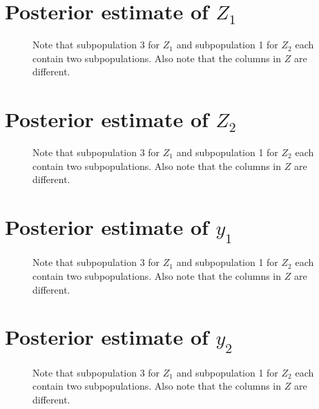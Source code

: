 \documentclass[10pt]{article} %
\begin{document}
\newpage
\section{Posterior estimate of $Z_1$}
\begin{figure}[H]
  \begin{center}  %
  \end{center}
  \caption{Note that subpopulation 3 for $Z_1$ and subpopulation 1 for $Z_2$
  each contain two subpopulations. Also note that the columns in $Z$ are different.}
  \label{fig:yzest}
\end{figure}

\newpage
\section{Posterior estimate of $Z_2$}
\begin{figure}[H]
  \begin{center}  %
  \end{center}
  \caption{Note that subpopulation 3 for $Z_1$ and subpopulation 1 for $Z_2$
  each contain two subpopulations. Also note that the columns in $Z$ are different.}
  \label{fig:yzest}
\end{figure}

\newpage
\section{Posterior estimate of $y_1$}
\begin{figure}[H]
  \begin{center}  %
  \end{center}
  \caption{Note that subpopulation 3 for $Z_1$ and subpopulation 1 for $Z_2$
  each contain two subpopulations. Also note that the columns in $Z$ are different.}
  \label{fig:yzest}
\end{figure}

\newpage
\section{Posterior estimate of $y_2$}
\begin{figure}[H]
  \begin{center}  %
  \end{center}
  \caption{Note that subpopulation 3 for $Z_1$ and subpopulation 1 for $Z_2$
  each contain two subpopulations. Also note that the columns in $Z$ are different.}
  \label{fig:yzest}
\end{figure}
\end{document}
